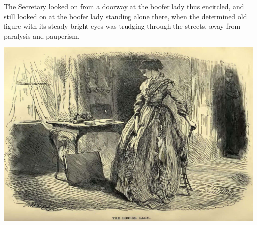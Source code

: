 The Secretary looked on from a doorway at the boofer lady thus
encircled, and still looked on at the boofer lady standing alone there,
when the determined old figure with its steady bright eyes was trudging
through the streets, away from paralysis and pauperism.

\includegraphics[scale=2.3]{02-14-01}

